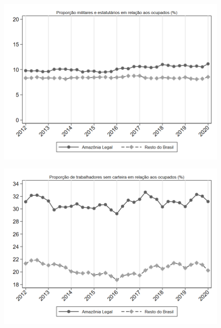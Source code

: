 \begin{frame}[label=_estrutura_emprego_prop_militar]{}
\textit{\hyperlink{_estrutura_emprego}{}}
\begin{figure}
  \centering
  \includegraphics[width=1.0\linewidth]{../../analysis/output/estrutura_emprego/_estrutura_emprego_prop_militar.png}
  \caption{}
  \label{fig:_estrutura_emprego_prop_militar}
\end{figure}
\end{frame}


\begin{frame}[label=_estrutura_emprego_prop_empregadoSC]{}
\textit{\hyperlink{_estrutura_emprego}{}}
\begin{figure}
  \centering
  \includegraphics[width=1.0\linewidth]{../../analysis/output/estrutura_emprego/_estrutura_emprego_prop_empregadoSC.png}
  \caption{}
  \label{fig:_estrutura_emprego_prop_empregadoSC}
\end{figure}
\end{frame}

